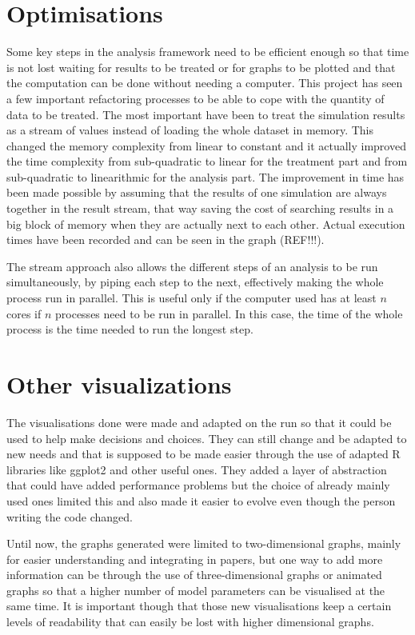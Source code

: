 \documentclass[a4paper,12pt]{report}
\begin{document}
\section{Optimisations}
Some key steps in the analysis framework need to be efficient enough so that time is not lost waiting for results to be treated or for graphs to be plotted and that the computation can be done without needing a computer.
This project has seen a few important refactoring processes to be able to cope with the quantity of data to be treated. The most important have been to treat the simulation results as a stream of values instead of loading the whole dataset in memory. This changed the memory complexity from linear to constant and it actually improved the time complexity from sub-quadratic to linear for the treatment part and from sub-quadratic to linearithmic for the analysis part. The improvement in time has been made possible by assuming that the results of one simulation are always together in the result stream, that way saving the cost of searching results in a big block of memory when they are actually next to each other.
Actual execution times have been recorded and can be seen in the graph (REF!!!).

The stream approach also allows the different steps of an analysis to be run simultaneously, by piping each step to the next, effectively making the whole process run in parallel. This is useful only if the computer used has at least $n$ cores if $n$ processes need to be run in parallel. In this case, the time of the whole process is the time needed to run the longest step.

\section{Other visualizations}
The visualisations done were made and adapted on the run so that it could be used to help make decisions and choices. They can still change and be adapted to new needs and that is supposed to be made easier through the use of adapted R libraries like ggplot2 and other useful ones. They added a layer of abstraction that could have added performance problems but the choice of already mainly used ones limited this and also made it easier to evolve even though the person writing the code changed.

Until now, the graphs generated were limited to two-dimensional graphs, mainly for easier understanding and integrating in papers, but one way to add more information can be through the use of three-dimensional graphs or animated graphs so that a higher number of model parameters can be visualised at the same time. It is important though that those new visualisations keep a certain levels of readability that can easily be lost with higher dimensional graphs.
\end{document}
